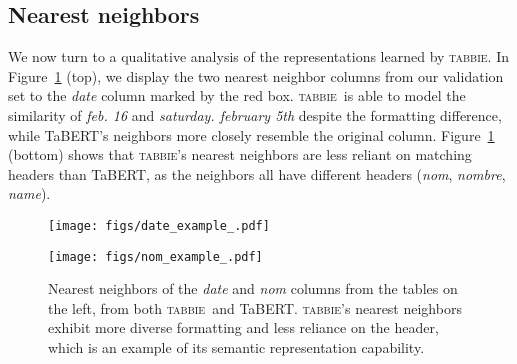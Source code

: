 \documentclass[11pt]{article}
\newcommand{\name}[0]{\textsc{tabbie}}
\begin{document}
\subsection{Nearest neighbors}
We now turn to a qualitative analysis of the representations learned by \name. In Figure~\ref{fig:date_example} (top), we display the two nearest neighbor columns from our validation set to the \emph{date} column marked by the red box. \name\ is able to model the similarity of \emph{feb. 16} and \emph{saturday. february 5th} despite the formatting difference, while TaBERT's neighbors more closely resemble the original column. Figure~\ref{fig:date_example} (bottom) shows that \name's nearest neighbors are less reliant on matching headers than TaBERT, as the neighbors all have different headers (\emph{nom}, \emph{nombre}, \emph{name}). 
\makeatother
\begin{figure}[t]
    \centering
  \texttt{[image: figs/date\_example\_.pdf]}

  \bigbreak
  \texttt{[image: figs/nom\_example\_.pdf]}
    \caption{Nearest neighbors of the  \emph{date} and \emph{nom} columns from the tables on the left, from both \name\ and TaBERT. \name's nearest neighbors exhibit more diverse formatting and less reliance on the header, which is an example of its semantic representation capability.}
  \label{fig:date_example}
\end{figure}
 
\end{document}
